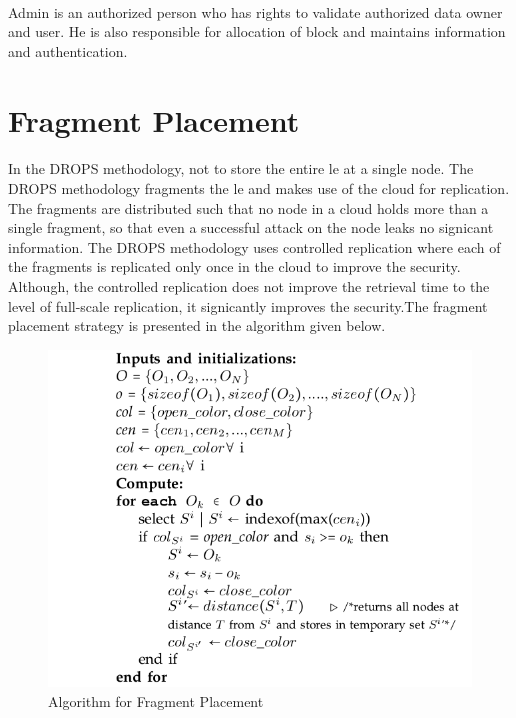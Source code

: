 \paragraph*{} 
Admin is an authorized person who has rights to validate authorized data owner
and user. He is also responsible for allocation of block and maintains information and
authentication.
\section{Fragment Placement}
\paragraph*{}
In the DROPS methodology, not to store the entire le at a single node. The DROPS
methodology fragments the le and makes use of the cloud for replication. The fragments
are distributed such that no node in a cloud holds more than a single fragment, so that even
a successful attack on the node leaks no signicant information. The DROPS methodology
uses controlled replication where each of the fragments is replicated only once in the cloud
to improve the security. Although, the controlled replication does not improve the retrieval
time to the level of full-scale replication, it signicantly improves the security.The fragment placement strategy is presented in
the algorithm given below.
\\
\begin{figure}
	\centering
	\includegraphics[scale=0.5]{placementalgo}
	\caption{Algorithm for Fragment Placement}
\end{figure}

